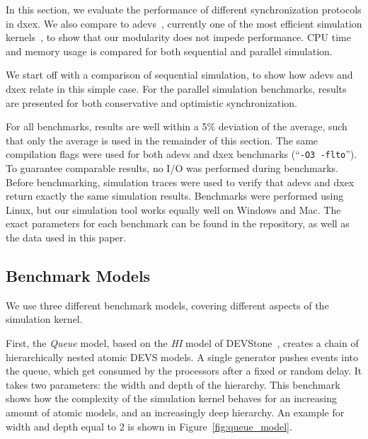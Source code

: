 
In this section, we evaluate the performance of different synchronization protocols in dxex.
We also compare to adevs~\cite{adevs}, currently one of the most efficient simulation kernels~\cite{DEVSSurvey,DEVStoneJournal}, to show that our modularity does not impede performance.
CPU time and memory usage is compared for both sequential and parallel simulation.

We start off with a comparison of sequential simulation, to show how adevs and dxex relate in this simple case.
For the parallel simulation benchmarks, results are presented for both conservative and optimistic synchronization.

For all benchmarks, results are well within a 5\% deviation of the average, such that only the average is used in the remainder of this section.
The same compilation flags were used for both adevs and dxex benchmarks (``\texttt{-O3 -flto}'').
To guarantee comparable results, no I/O was performed during benchmarks.
Before benchmarking, simulation traces were used to verify that adevs and dxex return exactly the same simulation results.
Benchmarks were performed using Linux, but our simulation tool works equally well on Windows and Mac.
The exact parameters for each benchmark can be found in the repository, as well as the data used in this paper. 

\subsection{Benchmark Models}
We use three different benchmark models, covering different aspects of the simulation kernel.

First, the \textit{Queue} model, based on the \textit{HI} model of DEVStone~\cite{DEVStone}, creates a chain of hierarchically nested atomic \textsf{DEVS} models.
A single generator pushes events into the queue, which get consumed by the processors after a fixed or random delay.
It takes two parameters: the width and depth of the hierarchy.
This benchmark shows how the complexity of the simulation kernel behaves for an increasing amount of atomic models, and an increasingly deep hierarchy.
An example for width and depth equal to 2 is shown in Figure~\ref{fig:queue_model}.
	

